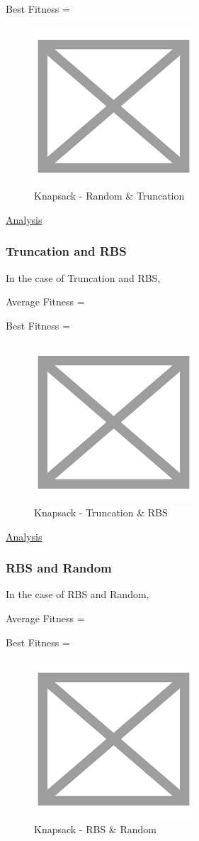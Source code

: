 \documentclass[11pt, letterpaper]{article}
\begin{document}
Best Fitness = 
\begin{figure}[H]
    \centering
    \includegraphics[scale = 0.6]{images/placeHolder.png}
    \caption {Knapsack - Random \& Truncation}
    \label {fig:gcRT}
\end{figure}

\underline{Analysis}
\subsubsection {Truncation and RBS}
In the case of Truncation and RBS,

Average Fitness = 

Best Fitness = 
\begin{figure}[H]
    \centering
    \includegraphics[scale = 0.6]{images/placeHolder.png}
    \caption {Knapsack - Truncation \& RBS}
    \label {fig:gcTR}
\end{figure}

\underline{Analysis}
\subsubsection {RBS and Random}
In the case of RBS and Random,

Average Fitness = 

Best Fitness = 
\begin{figure}[H]
    \centering
    \includegraphics[scale = 0.6]{images/placeHolder.png}
    \caption {Knapsack - RBS \& Random}
    \label {fig:gcRbR}
\end{figure}
\end{document}
